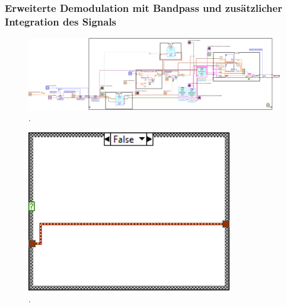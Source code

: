 \documentclass[
a4paper,
12pt,
pagesize,
ngerman
]{scrartcl}
\begin{document}
	
	
	\subsubsection{Erweiterte Demodulation mit Bandpass und zusätzlicher Integration des Signals}
	
	
	
	\begin{figure}[H]
		\centering
		\includegraphics[width=1.0\textwidth]{EIRE2018Dateien/Tag4/OsziFMPM-Demod/mitBandpassUndIntegrationBilder/OsziPlusFMPMd}
		\caption{.}
	\end{figure}
	
	\begin{figure}[H]
		\centering
		\includegraphics[width=0.8\textwidth]{EIRE2018Dateien/Tag4/OsziFMPM-Demod/mitBandpassUndIntegrationBilder/OsziPlusFMPMd6} %
		\caption{.}
	\end{figure}
		
\end{document}
